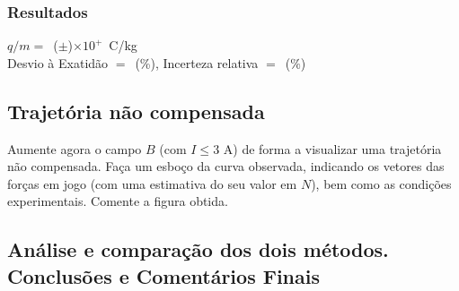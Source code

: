 \documentclass[a4paper,12pt]{article}  %
\begin{document}
\subsubsection{\sf Resultados}
\noindent  $q/m =$~(\underline{\makebox[1.5cm][r]{~}}$\pm$\underline{\makebox[1cm][r]{~}})$\times 10^{+}\,$  C/kg  \\  


\noindent  Desvio à Exatidão $=$~\underline{\makebox[1cm][r]{~}}(\%), 
Incerteza relativa $=$~\underline{\makebox[1cm][r]{~}}($\%$) 


\subsection{\sf Trajetória não compensada}
Aumente agora o campo $B$ (com $I\leq 3$ A) de forma a visualizar uma trajetória não compensada.  Faça um esboço da curva observada, indicando os vetores das forças em jogo (com uma estimativa do seu valor em $N$), bem como as condições experimentais. Comente a figura obtida.
\begin{center}
\framebox[18cm]{\rule{0pt}{6.5cm}}
\end{center}

\subsection{\sf Análise e comparação dos dois métodos. Conclusões e Comentários Finais}
\noindent\underline{\makebox[\textwidth][r]{~}} \\
\noindent\underline{\makebox[\textwidth][r]{~}} \\
\noindent\underline{\makebox[\textwidth][r]{~}} \\
\noindent\underline{\makebox[\textwidth][r]{~}} \\
\noindent\underline{\makebox[\textwidth][r]{~}} \\
\noindent\underline{\makebox[\textwidth][r]{~}} \\
\noindent\underline{\makebox[\textwidth][r]{~}} \\
\noindent\underline{\makebox[\textwidth][r]{~}} \\
\noindent\underline{\makebox[\textwidth][r]{~}} \\
\noindent\underline{\makebox[\textwidth][r]{~}} \\
\noindent\underline{\makebox[\textwidth][r]{~}} \\
\noindent\underline{\makebox[\textwidth][r]{~}} \\
\noindent\underline{\makebox[17cm][r]{~}} \\



\end{document}
